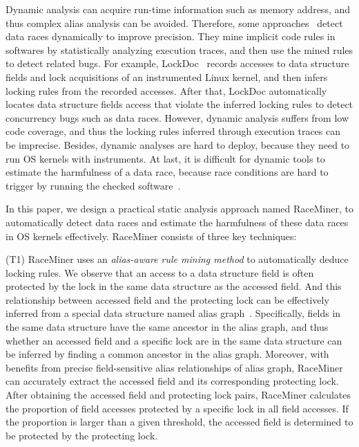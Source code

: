 Dynamic analysis can acquire run-time information such as memory address, and 
thus complex alias analysis can be avoided. Therefore, some 
approaches~\cite{Lochmann:EuroSys19, Lu:SOSP07, Lu:FSE18, Joshi:ASE08, 
Liu:NSDI07} detect data races dynamically to improve precision. They mine 
implicit code rules in softwares by statistically analyzing execution traces, 
and then use the mined rules to detect related bugs. For example, 
LockDoc~\cite{Lochmann:EuroSys19} records accesses to data structure fields and 
lock acquisitions of an instrumented Linux kernel, and then infers locking 
rules from the recorded accesses. After that, LockDoc automatically locates 
data structure fields access that violate the inferred locking rules to detect 
concurrency bugs such as data races. However, dynamic analysis suffers from low 
code coverage, and thus the locking rules inferred through execution traces can 
be imprecise. Besides, dynamic analyses are hard to deploy, because they need 
to run OS kernels with instruments. At last, it is difficult for dynamic 
tools to estimate the harmfulness of a data race, because race conditions are 
hard to trigger by running the checked software~\cite{Fonseca:DSN10, 
Burckhardt:ASPLOS10, Liu:FSE14, Zhou:EASE15}.

In this paper, we design a practical static analysis approach named RaceMiner, 
to automatically detect data races and estimate the harmfulness of these data 
races in OS kernels effectively. RaceMiner consists of three key techniques:

(T1) RaceMiner uses an {\em alias-aware rule mining method} to automatically 
deduce locking rules. We observe that an access to a data structure field is 
often protected by the lock in the same data structure as the accessed field. 
And this relationship between accessed field and the protecting lock can be 
effectively inferred from a special data structure named alias 
graph~\cite{Li:ASPLOS22, Kastrinis:CC18}. Specifically, fields in the same data 
structure have the same ancestor in the alias graph, and thus whether an 
accessed field and a specific lock are in the same data structure can be 
inferred by finding a common ancestor in the alias graph. Moreover, with 
benefits from precise field-sensitive alias relationships of alias graph, 
RaceMiner can accurately extract the accessed field and its corresponding 
protecting lock. After obtaining the accessed field and protecting lock pairs, 
RaceMiner calculates the proportion of field accesses protected by a specific 
lock in all field accesses. If the proportion is larger than a given threshold, 
the accessed field is determined to be protected by the protecting lock.

